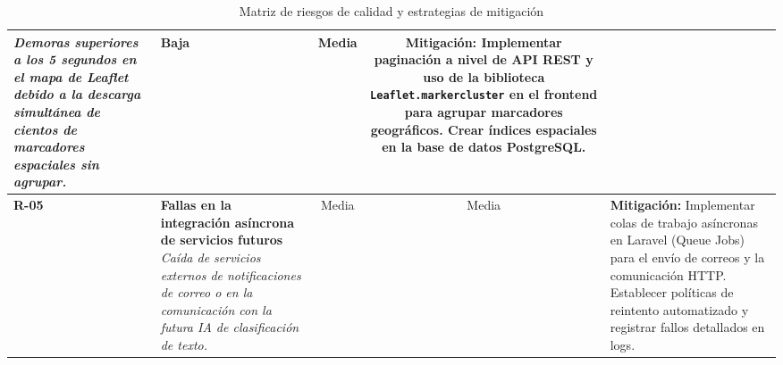 \begin{table}[H]
\begin{tabularx}{\textwidth}{l X c c X}
\textit{Demoras superiores a los 5 segundos en el mapa de Leaflet debido a la descarga simultánea de cientos de marcadores espaciales sin agrupar.} & 
Baja & 
Media & 
\textbf{Mitigación:} Implementar paginación a nivel de API REST y uso de la biblioteca \texttt{Leaflet.markercluster} en el frontend para agrupar marcadores geográficos. Crear índices espaciales en la base de datos PostgreSQL. \\
\midrule
\textbf{R-05} & 
\textbf{Fallas en la integración asíncrona de servicios futuros} \newline 
\textit{Caída de servicios externos de notificaciones de correo o en la comunicación con la futura IA de clasificación de texto.} & 
Media & 
Media & 
\textbf{Mitigación:} Implementar colas de trabajo asíncronas en Laravel (Queue Jobs) para el envío de correos y la comunicación HTTP. Establecer políticas de reintento automatizado y registrar fallos detallados en logs. \\
\bottomrule
\end{tabularx}
\caption{Matriz de riesgos de calidad y estrategias de mitigación}
\label{tab:riesgos_calidad}
\end{table}